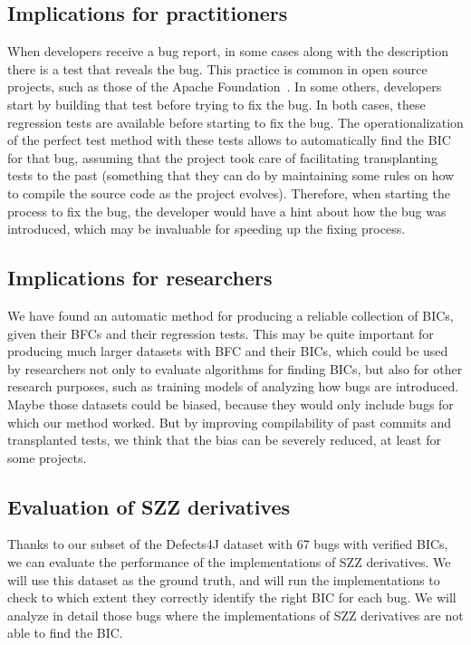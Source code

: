 \subsection{Implications for practitioners}
\label{sec:implications-practitioners}

When developers receive a bug report, in some cases along with the description there is a test that reveals the bug. 
This practice is common in open source projects, such as those of the Apache Foundation~\cite{iida2016improving}.
In some others, developers start by building that test before trying to fix the bug. In both cases, these regression tests are available before starting to fix the bug. The operationalization of the perfect test method with these tests allows to automatically find the BIC for that bug, assuming that the project took care of facilitating transplanting tests to the past (something that they can do by maintaining some rules on how to compile the source code as the project evolves). 
Therefore, when starting the process to fix the bug, the developer would have a hint about how the bug was introduced, which may be invaluable for speeding up the fixing process.

\subsection{Implications for researchers}
\label{sec:implications-researchers}

We have found an automatic method for producing a reliable collection of BICs, given their BFCs and their regression tests. 
This may be quite important for producing much larger datasets with BFC and their BICs, which could be used by researchers not only to evaluate algorithms for finding BICs, but also for other research purposes, such as training models of analyzing how bugs are introduced. Maybe those datasets could be biased, because they would only include bugs for which our method worked. But by improving compilability of past commits and transplanted tests, we think that the bias can be severely reduced, at least for some projects.

\subsection{Evaluation of SZZ derivatives}
\label{subsec:szz-tools}

Thanks to our subset of the Defects4J dataset with 67 bugs with verified BICs, we can evaluate the performance of the implementations of SZZ derivatives. 
We will use this dataset as the ground truth, and will run the implementations to check to which extent they correctly identify the right BIC for each bug.
We will analyze in detail those bugs where the implementations of SZZ derivatives are not able to find the BIC.

